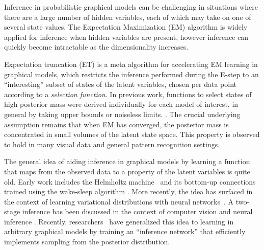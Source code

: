 Inference in probabilistic graphical models can be challenging in situations where
there are a large number of hidden variables, each of which may take on one of several
state values. The Expectation Maximization (EM) algorithm is widely applied for inference when hidden variables
are present, however inference can quickly become intractable as the dimensionality increases.

Expectation truncation (ET) \citep{LuckeEggert2010} is a meta algorithm for accelerating EM learning
in graphical models, which restricts the inference performed during the E-step
to an ``interesting'' subset of states of the latent variables,  %
chosen per data point according to a \emph{selection function}.
In previous work, functions to select states of high posterior mass were 
derived individually for each model of interest, in general by taking upper bounds or noiseless limits. 
\citep{LuckeEggert2010,SheltonEtAl2012,BornscheinEtAl2013,SheikhEtAl2014}.
The crucial underlying assumption remains that 
when EM has converged,
the posterior mass is  concentrated in small volumes of the latent state space.
This property is observed to hold in many visual data and general pattern recognition settings.

The general idea of aiding inference in graphical models by
learning a function that maps from the observed data to
a property of the latent variables is quite old. Early work includes the
Helmholtz machine~\cite{Dayan95thehelmholtz} and its bottom-up connections trained using the wake-sleep
algorithm \citep{HintonEtAl1995}.
More recently, the idea has surfaced in the context of learning variational distributions with neural networks~\citep{WellingICML2014}.
A two-stage inference has  been discussed in the context of
computer vision \citep{YuilleKersten2006} and neural inference \citep{KoernerEtAl1999}.
Recently, researchers~\citep{MnihGregor2014} %
have generalized this idea to learning in arbitrary graphical models by training
an ``inference network'' that efficiently implements sampling from the posterior
distribution.

